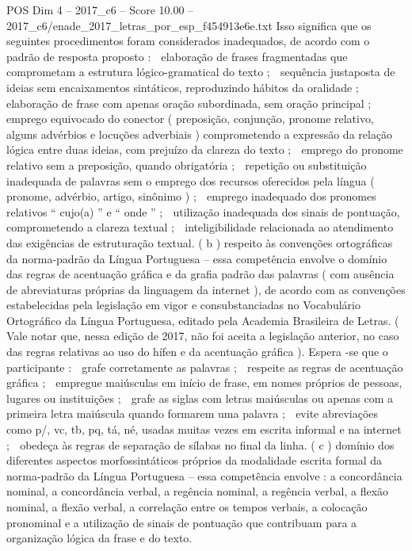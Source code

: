 \begin{textsample}{POS Dim 4 – 2017\_c6 – Score 10.00 – 2017\_c6/enade\_2017\_letras\_por\_esp\_f454913e6e.txt}
Isso significa que os seguintes procedimentos foram considerados inadequados, de acordo com o padrão de resposta proposto :  elaboração de frases fragmentadas que comprometam a estrutura lógico-gramatical do texto ;  sequência justaposta de ideias sem encaixamentos sintáticos, reproduzindo hábitos da oralidade ;  elaboração de frase com apenas oração subordinada, sem oração principal ;  emprego equivocado do conector ( preposição, conjunção, pronome relativo, alguns advérbios e locuções adverbiais ) comprometendo a expressão da relação lógica entre duas ideias, com prejuízo da clareza do texto ;  emprego do pronome relativo sem a preposição, quando obrigatória ;  repetição ou substituição inadequada de palavras sem o emprego dos recursos oferecidos pela língua ( pronome, advérbio, artigo, sinônimo ) ;  emprego inadequado dos pronomes relativos “ cujo(a) ” e “ onde ” ;  utilização inadequada dos sinais de pontuação, comprometendo a clareza textual ;  inteligibilidade relacionada ao atendimento das exigências de estruturação textual. ( b ) respeito às convenções ortográficas da norma-padrão da Língua Portuguesa – essa competência envolve o domínio das regras de acentuação gráfica e da grafia padrão das palavras ( com ausência de abreviaturas próprias da linguagem da internet ), de acordo com as convenções estabelecidas pela legislação em vigor e consubstanciadas no Vocabulário Ortográfico da Língua Portuguesa, editado pela Academia Brasileira de Letras. ( Vale notar que, nessa edição de 2017, não foi aceita a legislação anterior, no caso das regras relativas ao uso do hífen e da acentuação gráfica ).
Espera -se que o participante :  grafe corretamente as palavras ;  respeite as regras de acentuação gráfica ;  empregue maiúsculas em início de frase, em nomes próprios de pessoas, lugares ou instituições ;  grafe as siglas com letras maiúsculas ou apenas com a primeira letra maiúscula quando formarem uma palavra ;  evite abreviações como p/, vc, tb, pq, tá, né, usadas muitas vezes em escrita informal e na internet ;  obedeça às regras de separação de sílabas no final da linha. ( c ) domínio dos diferentes aspectos morfossintáticos próprios da modalidade escrita formal da norma-padrão da Língua Portuguesa – essa competência envolve : a concordância nominal, a concordância verbal, a regência nominal, a regência verbal, a flexão nominal, a flexão verbal, a correlação entre os tempos verbais, a colocação pronominal e a utilização de sinais de pontuação que contribuam para a organização lógica da frase e do texto.

\end{textsample}
